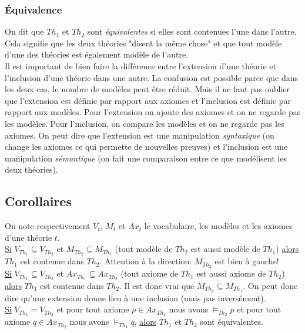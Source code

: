 {\subsubsection{Équivalence}
On dit que $Th_1$ et $Th_2$ sont {\em équivalentes} si elles sont contenues l'une dans l'autre.
Cela signifie que les deux théories "disent la même chose" et que tout modèle d'une des théories est également modèle de l'autre.\\


Il est important de bien faire la différence entre
l'extension d'une théorie et l'inclusion d'une théorie dans une autre.
La confusion est possible parce que dans les deux cas, le nombre de modèles peut être réduit.
Mais il ne faut pas oublier que
l'extension est définie par rapport aux axiomes et l'inclusion est définie par rapport aux modèles.
Pour l'extension on ajoute des axiomes et on ne regarde pas les modèles.
Pour l'inclusion, on compare les modèles et on ne regarde pas les axiomes.
On peut dire que l'extension est une manipulation {\em syntaxique} (on change les axiomes ce qui permette de nouvelles preuves)
et l'inclusion est une manipulation {\em sémantique} (on fait une comparaison entre ce que modélisent les deux théories).

\subsection{Corollaires}
On note respectivement $V_t$, $M_t$ et $Ax_t$ le vocabulaire, les modèles et les axiomes d'une théorie $t$. \\

\noindent \underline{Si} $V_{Th_1} \subseteq V_{Th_2}$ et $M_{Th_2} \subseteq M_{Th_1}$
(tout modèle de $Th_2$ est aussi modèle de $Th_1$) \underline{alors} $Th_1$ est contenue dans $Th_2$.
Attention à la direction: $M_{Th_2}$ est bien à gauche!
\\

\noindent \underline{Si} $V_{Th_1} \subseteq V_{Th_2}$ et $Ax_{Th_1} \subseteq Ax_{Th_2}$
(tout axiome de $Th_1$ est aussi axiome de $Th_2$) \underline{alors} $Th_1$ est contenue dans $Th_2$.
Il est donc vrai que $M_{Th_2} \subseteq M_{Th_1}$.
On peut donc dire qu'une extension donne lieu à une inclusion (mais pas inversément).\\

\noindent \underline{Si} $V_{Th_1} = V_{Th_2}$ 
et pour tout axiome $p \in Ax_{Th_1}$ nous avons $\models_{Th_2} p$
et pour tout axiome $q \in Ax_{Th_2}$ nous avons $\models_{Th_1} q$,
\underline{alors}
$Th_1$ et $Th_2$ sont équivalentes. \\

}
